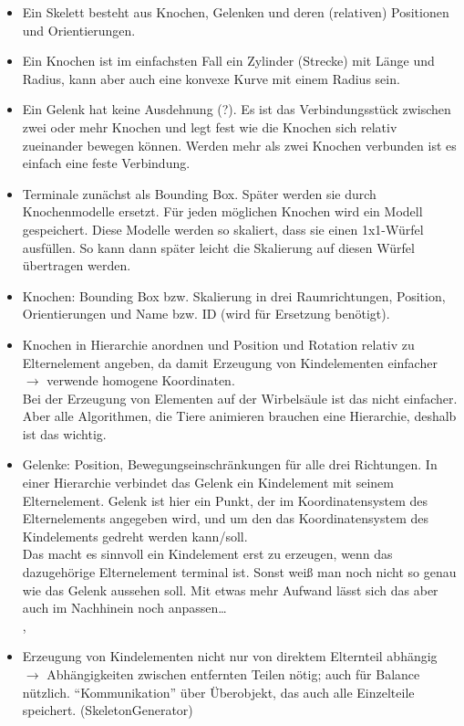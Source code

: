 \begin{itemize}
 \item Ein Skelett besteht aus Knochen, Gelenken und deren (relativen) Positionen und Orientierungen.
 
 \item Ein Knochen ist im einfachsten Fall ein Zylinder (Strecke) mit Länge und Radius, kann aber auch eine konvexe Kurve mit einem Radius sein.
 
 \item Ein Gelenk hat keine Ausdehnung (?). Es ist das Verbindungsstück zwischen zwei oder mehr Knochen und legt fest wie die Knochen sich relativ zueinander bewegen können. Werden mehr als zwei Knochen verbunden ist es einfach eine feste Verbindung.
 
 \item Terminale zunächst als Bounding Box. Später werden sie durch Knochenmodelle ersetzt. Für jeden möglichen Knochen wird ein Modell gespeichert. Diese Modelle werden so skaliert, dass sie einen 1x1-Würfel ausfüllen. So kann dann später leicht die Skalierung auf diesen Würfel übertragen werden.
 
 \item Knochen: Bounding Box bzw. Skalierung in drei Raumrichtungen, Position, Orientierungen und Name bzw. ID (wird für Ersetzung benötigt).
 
 \item Knochen in Hierarchie anordnen und Position und Rotation relativ zu Elternelement angeben, da damit Erzeugung von Kindelementen einfacher $\rightarrow$ verwende homogene Koordinaten.\\
 Bei der Erzeugung von Elementen auf der Wirbelsäule ist das nicht einfacher. Aber alle Algorithmen, die Tiere animieren brauchen eine Hierarchie, deshalb ist das wichtig. 
 
 \item Gelenke: Position, Bewegungseinschränkungen für alle drei Richtungen. In einer Hierarchie verbindet das Gelenk ein Kindelement mit seinem Elternelement. Gelenk ist hier ein Punkt, der im Koordinatensystem des Elternelements angegeben wird, und um den das Koordinatensystem des Kindelements gedreht werden kann/soll.\\
 Das macht es sinnvoll ein Kindelement erst zu erzeugen, wenn das dazugehörige Elternelement terminal ist. Sonst weiß man noch nicht so genau wie das Gelenk aussehen soll. Mit etwas mehr Aufwand lässt sich das aber auch im Nachhinein noch anpassen\dots\\
 , %
 
 \item Erzeugung von Kindelementen nicht nur von direktem Elternteil abhängig $\rightarrow$ Abhängigkeiten zwischen entfernten Teilen nötig; auch für Balance nützlich. "`Kommunikation"' über Überobjekt, das auch alle Einzelteile speichert. (SkeletonGenerator)
\end{itemize}


